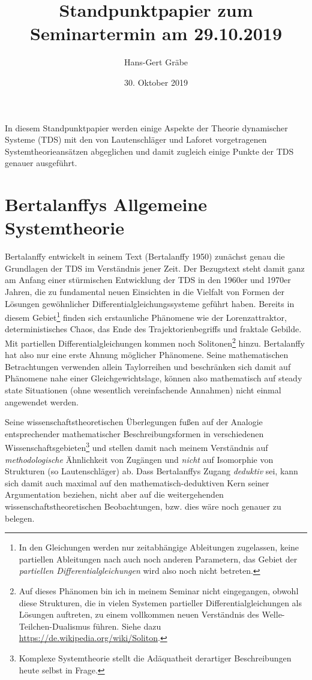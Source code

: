 \documentclass[11pt,a4paper]{article}
\title{Standpunktpapier zum Seminartermin am 29.10.2019}
\author{Hans-Gert Gr\"abe}
\date{30. Oktober 2019}
\begin{document}
\maketitle

In diesem Standpunktpapier werden einige Aspekte der Theorie dynamischer
Systeme (TDS) mit den von Lautenschläger und Laforet vorgetragenen
Systemtheorieansätzen abgeglichen und damit zugleich einige Punkte der TDS
genauer ausgeführt.

\section{Bertalanffys Allgemeine Systemtheorie}

Bertalanffy entwickelt in seinem Text (Bertalanffy 1950) zunächst genau die
Grundlagen der TDS im Verständnis jener Zeit.  Der Bezugstext steht damit ganz
am Anfang einer stürmischen Entwicklung der TDS in den 1960er und 1970er
Jahren, die zu fundamental neuen Einsichten in die Vielfalt von Formen der
Lösungen gewöhnlicher Differentialgleichungssysteme geführt haben.  Bereits in
diesem Gebiet\footnote{In den Gleichungen werden nur zeitabhängige Ableitungen
  zugelassen, keine partiellen Ableitungen nach auch noch anderen Parametern,
  das Gebiet der \emph{partiellen Differentialgleichungen} wird also noch
  nicht betreten.} finden sich erstaunliche Phänomene wie der Lorenzattraktor,
deterministisches Chaos, das Ende des Trajektorienbegriffs und fraktale
Gebilde. Mit partiellen Differentialgleichungen kommen noch
Solitonen\footnote{Auf dieses Phänomen bin ich in meinem Seminar nicht
  eingegangen, obwohl diese Strukturen, die in vielen Systemen partieller
  Differentialgleichungen als Lösungen auftreten, zu einem vollkommen neuen
  Verständnis des Welle-Teilchen-Dualismus führen. Siehe dazu
  \url{https://de.wikipedia.org/wiki/Soliton}. } hinzu. Bertalanffy hat also
nur eine erste Ahnung möglicher Phänomene. Seine mathematischen Betrachtungen
verwenden allein Taylorreihen und beschränken sich damit auf Phänomene nahe
einer Gleichgewichtslage, können also mathematisch auf steady state
Situationen (ohne wesentlich vereinfachende Annahmen) nicht einmal angewendet
werden.

Seine wissenschaftstheoretischen Überlegungen fußen auf der Analogie
entsprechender mathematischer Beschreibungsformen in verschiedenen
Wissenschaftsgebieten\footnote{Komplexe Systemtheorie stellt die Adäquatheit
  derartiger Beschreibungen heute selbst in Frage.} und stellen damit nach
meinem Verständnis auf \emph{methodologische} Ähnlichkeit von Zugängen und
\emph{nicht} auf Isomorphie von Strukturen (so Lautenschläger) ab. Dass
Bertalanffys Zugang \emph{deduktiv} sei, kann sich damit auch maximal auf den
mathematisch-deduktiven Kern seiner Argumentation beziehen, nicht aber auf die
weitergehenden wissenschaftstheoretischen Beobachtungen, bzw. dies wäre noch
genauer zu belegen.
\end{document}
